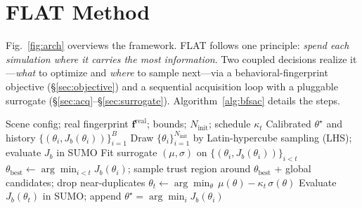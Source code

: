 \documentclass[conference]{IEEEtran}
\begin{document}
\section{FLAT Method}
\label{sec:method}

Fig.~\ref{fig:arch} overviews the framework. FLAT follows one principle: \emph{spend each simulation where it carries the most information}. Two coupled decisions realize it---\emph{what} to optimize and \emph{where} to sample next---via a behavioral-fingerprint objective (\S\ref{sec:objective}) and a sequential acquisition loop with a pluggable surrogate (\S\ref{sec:acq}--\S\ref{sec:surrogate}). Algorithm~\ref{alg:bfsac} details the steps.

\begin{algorithm}[h]
  \caption{FLAT calibration under simulation budget $B$.}
  \label{alg:bfsac}
  {\small
  \begin{algorithmic}[1]
    \Require Scene config; real fingerprint $\mathbf{f}^{\mathrm{real}}$; bounds; $N_{\mathrm{init}}$; schedule $\kappa_t$
    \Ensure Calibrated $\theta^\star$ and history $\{(\theta_i, J_b(\theta_i))\}_{i=1}^{B}$
    \State Draw $\{\theta_i\}_{i=1}^{N_{\mathrm{init}}}$ by Latin-hypercube sampling (LHS); evaluate $J_b$ in SUMO 
     
      \State Fit surrogate $(\mu,\sigma)$ on $\{(\theta_i,J_b(\theta_i))\}_{i<t}$
      \State $\theta_{\mathrm{best}} \leftarrow \arg\min_{i<t} J_b(\theta_i)$; sample trust region around $\theta_{\mathrm{best}}$ + global candidates; drop near-duplicates
      \State $\theta_t \leftarrow \arg\min_\theta\, \mu(\theta)-\kappa_t\,\sigma(\theta)$
      \State Evaluate $J_b(\theta_t)$ in SUMO; append
    \EndFor
    \State \Return $\theta^\star=\arg\min_i J_b(\theta_i)$
  \end{algorithmic}
  }
\end{algorithm}
\end{document}

